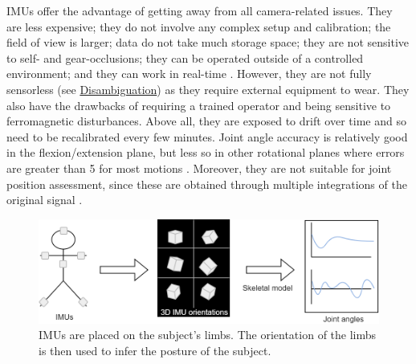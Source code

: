 IMUs offer the advantage of getting away from all camera-related issues. They are less expensive; they do not involve any complex setup and calibration; the field of view is larger; data do not take much storage space; they are not sensitive to self- and gear-occlusions; they can be operated outside of a controlled environment; and they can work in real-time \cite{Johnston2019,Chambers2015}. However, they are not fully sensorless (see \hyperlink{Ann:gloss}{Disambiguation})  as they require external equipment to wear. They also have the drawbacks of requiring a trained operator and being sensitive to ferromagnetic disturbances. Above all, they are exposed to drift over time and so need to be recalibrated every few minutes. Joint angle accuracy is relatively good in the flexion/extension plane, but less so in other rotational planes where errors are greater than 5\degree{} for most motions \cite{Zhang2013, Rekant2022}. Moreover, they are not suitable for joint position assessment, since these are obtained through multiple integrations of the original signal \cite{Ahmad2013}. 

\begin{figure}[hbtp]
	\centering
	\def\svgwidth{1\columnwidth}
	\fontsize{10pt}{10pt}\selectfont
	\includegraphics[width=0.8\linewidth]{"../Chap1/Figures/Fig_IMUs.png"}
	\caption{IMUs are placed on the subject's limbs. The orientation of the limbs is then used to infer the posture of the subject.}
	\label{fig_imus}
\end{figure}
\FloatBarrier

